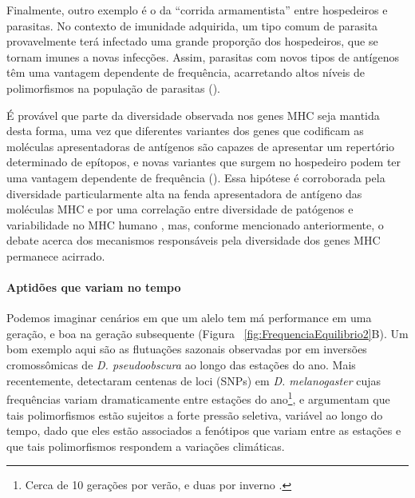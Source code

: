 \begin{refsection}
    Finalmente, outro exemplo é o da \enquote{corrida armamentista} entre hospedeiros e parasitas. No contexto de imunidade adquirida, um tipo comum de parasita provavelmente terá infectado uma grande proporção dos hospedeiros, que se tornam imunes a novas infecções. Assim, parasitas com novos tipos de antígenos têm uma vantagem dependente de frequência, acarretando altos níveis de polimorfismos na população de parasitas (\cite{Trachtenberg2003,Borghans2004,Slade1992,Spurgin2010}). 
    
    É provável que parte da diversidade observada nos genes MHC seja mantida desta forma, uma vez que diferentes variantes dos genes que codificam as moléculas apresentadoras de antígenos são capazes de apresentar um repertório determinado de epítopos, e novas variantes que surgem no hospedeiro podem ter uma vantagem dependente de frequência (\cite{Trachtenberg2003,Borghans2004}). Essa hipótese é corroborada pela diversidade particularmente alta na fenda apresentadora de antígeno das moléculas MHC \parencite{Hedrick2003} e por uma correlação entre diversidade de patógenos e variabilidade no MHC humano \parencite{Prugnolle2005}, mas, conforme mencionado anteriormente, o debate acerca dos mecanismos responsáveis pela diversidade dos genes MHC permanece acirrado.  

\paragraph{Aptidões que variam no tempo}

Podemos imaginar cenários em que um alelo tem má performance em uma geração, e boa na geração subsequente (Figura ~\ref{fig:FrequenciaEquilibrio2}B). Um bom exemplo aqui são as flutuações sazonais observadas por \textcite{Dobzhansky1937} em inversões cromossômicas de \emph{D. pseudoobscura} ao longo das estações do ano. Mais recentemente, \textcite{Bergland2014} detectaram centenas de loci (SNPs) em \emph{D. melanogaster} cujas frequências variam dramaticamente entre estações do ano\footnote{Cerca de 10 gerações por verão, e duas por inverno \parencite{Bergland2014}.}, e argumentam que tais polimorfismos estão sujeitos a forte pressão seletiva, variável ao longo do tempo, dado que eles estão associados a fenótipos que variam entre as estações e que tais polimorfismos respondem a variações climáticas. 


\end{refsection}
